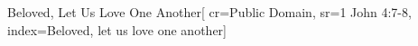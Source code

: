 {Beloved, Let Us Love One Another}[
    cr={Public Domain},
    sr={1 John 4:7-8},
    index={Beloved, let us love one another}]
